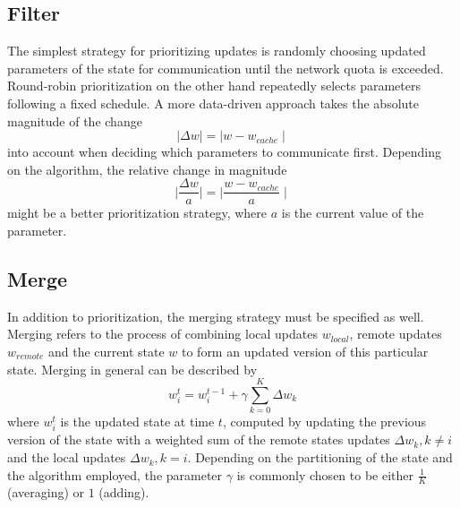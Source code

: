\subsection{Filter}
The simplest strategy for prioritizing updates is randomly choosing updated parameters of the state for communication until the network quota is exceeded.
Round-robin prioritization on the other hand repeatedly selects parameters following a fixed schedule.
A more data-driven approach takes the absolute magnitude of the change
\begin{equation}
\mid\Delta w\mid = \mid w - w_{cache} \mid
\label{eqn:absolute_magnitude}
\end{equation}
into account when deciding which parameters to communicate first.
Depending on the algorithm, the relative change in magnitude
\begin{equation}
\mid\frac{\Delta w}{a} \mid = \mid\frac{w - w_{cache}}{a} \mid
\label{eqn:relative_magnitude}
\end{equation}
might be a better prioritization strategy, where $a$ is the current value of the parameter.

\subsection{Merge}
In addition to prioritization, the merging strategy must be specified as well.
Merging refers to the process of combining local updates $w_{local}$, remote updates $w_{remote}$ and the current state $w$ to form an updated version of this particular state.
Merging in general can be described by
\begin{equation}
w_{i}^{t} = w_{i}^{t-1} + \gamma\sum_{k = 0}^{K}\Delta w_{k}
\label{eqn:state_merging}
\end{equation}
where $w_i^t$ is the updated state at time $t$, computed by updating the previous version of the state with a weighted sum of the remote states updates $\Delta w_k, k \neq i$ and the local updates $\Delta w_k, k = i$.
Depending on the partitioning of the state and the algorithm employed, the parameter $\gamma$ is commonly chosen to be either $\frac{1}{K}$ (averaging) or $1$ (adding).
